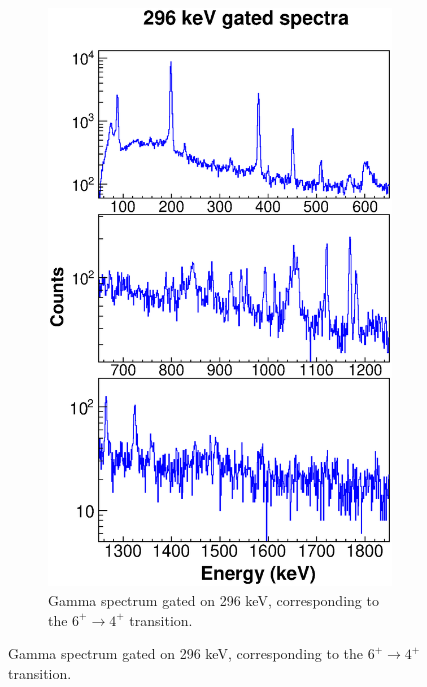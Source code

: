     \begin{figure}
    \ContinuedFloat
    \begin{subfigure}{\textwidth}
    \includegraphics[scale=0.8]{156GdTablesAndFigs/296_gamma.eps}
    \caption{Gamma spectrum gated on 296 keV, corresponding to the $6^+\rightarrow4^+$ transition.}
    \label{fig:156_6to4spec}
    \end{subfigure}
\end{figure}